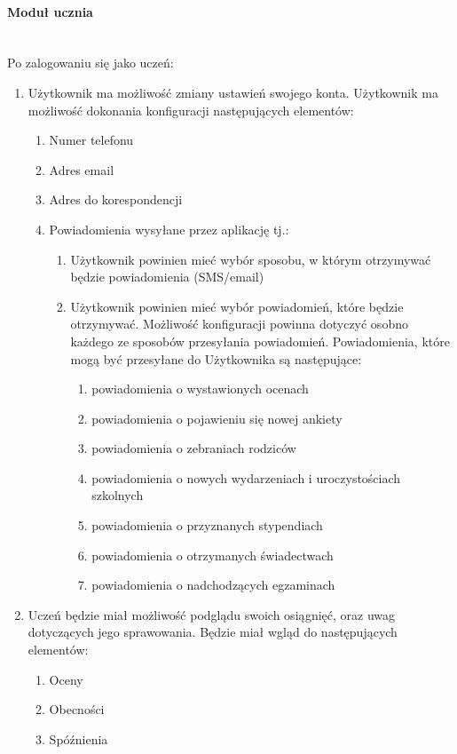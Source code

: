 \documentclass{article}
\begin{document}
\paragraph{Moduł ucznia} \mbox{}\\
Po zalogowaniu się jako uczeń:
\begin{enumerate}
	\item Użytkownik ma możliwość zmiany ustawień swojego konta. Użytkownik ma możliwość dokonania konfiguracji następujących elementów:
	\begin{enumerate}
		\item Numer telefonu
		\item Adres email
		\item Adres do korespondencji
		\item Powiadomienia wysyłane przez aplikację tj.:
		\begin{enumerate}
			\item Użytkownik powinien mieć wybór sposobu, w którym otrzymywać będzie powiadomienia (SMS/email)
			\item Użytkownik powinien mieć wybór powiadomień, które będzie otrzymywać. Możliwość konfiguracji powinna dotyczyć osobno każdego ze sposobów przesyłania powiadomień. Powiadomienia, które mogą być przesyłane do Użytkownika są następujące:
			\begin{enumerate}
				\item powiadomienia o wystawionych ocenach
				\item powiadomienia o pojawieniu się nowej ankiety
				\item powiadomienia o zebraniach rodziców
				\item powiadomienia o nowych wydarzeniach i uroczystościach szkolnych
				\item powiadomienia o przyznanych stypendiach
				\item powiadomienia o otrzymanych świadectwach
				\item powiadomienia o nadchodzących egzaminach
			\end{enumerate}
		\end{enumerate} 
	\end{enumerate}
	\item Uczeń będzie miał możliwość podglądu swoich osiągnięć, oraz uwag dotyczących jego sprawowania. Będzie miał wgląd do następujących elementów:
	\begin{enumerate}
		\item Oceny
		\item Obecności
		\item Spóźnienia

\end{enumerate}
\end{enumerate}
\end{document}
